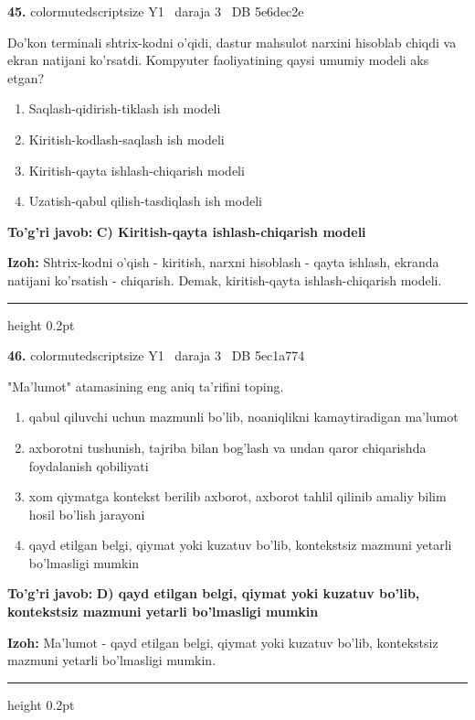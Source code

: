 \documentclass[10pt,a4paper,oneside]{article}
\begin{document}
\noindent\textbf{\color{ink}45.}  {color{muted}scriptsize Y1 \textbullet\ daraja 3 \textbullet\ DB 5e6dec2e}
\par
Do'kon terminali shtrix-kodni o'qidi, dastur mahsulot narxini hisoblab chiqdi va ekran natijani ko'rsatdi. Kompyuter faoliyatining qaysi umumiy modeli aks etgan?
\begin{enumerate}[label=\Alph*),leftmargin=9mm]
\item Saqlash-qidirish-tiklash ish modeli
\item Kiritish-kodlash-saqlash ish modeli
\item Kiritish-qayta ishlash-chiqarish modeli
\item Uzatish-qabul qilish-tasdiqlash ish modeli
\end{enumerate}
\begin{tcolorbox}[enhanced,breakable,colback=teal!4,colframe=teal!50!black,boxrule=0.5pt,arc=1.1mm,left=3mm,right=3mm,top=1.7mm,bottom=1.7mm,before skip=2mm,after skip=2mm]
\textbf{\color{teal}To'g'ri javob:} \textbf{C) Kiritish-qayta ishlash-chiqarish modeli}
\par\smallskip
\textbf{Izoh:} Shtrix-kodni o'qish - kiritish, narxni hisoblash - qayta ishlash, ekranda natijani ko'rsatish - chiqarish. Demak, kiritish-qayta ishlash-chiqarish modeli.
\end{tcolorbox}
\vspace{2mm}\hrule height 0.2pt \vspace{3mm}

\noindent\textbf{\color{ink}46.}  {color{muted}scriptsize Y1 \textbullet\ daraja 3 \textbullet\ DB 5ec1a774}
\par
"Ma'lumot" atamasining eng aniq ta'rifini toping.
\begin{enumerate}[label=\Alph*),leftmargin=9mm]
\item qabul qiluvchi uchun mazmunli bo'lib, noaniqlikni kamaytiradigan ma'lumot
\item axborotni tushunish, tajriba bilan bog'lash va undan qaror chiqarishda foydalanish qobiliyati
\item xom qiymatga kontekst berilib axborot, axborot tahlil qilinib amaliy bilim hosil bo'lish jarayoni
\item qayd etilgan belgi, qiymat yoki kuzatuv bo'lib, kontekstsiz mazmuni yetarli bo'lmasligi mumkin
\end{enumerate}
\begin{tcolorbox}[enhanced,breakable,colback=teal!4,colframe=teal!50!black,boxrule=0.5pt,arc=1.1mm,left=3mm,right=3mm,top=1.7mm,bottom=1.7mm,before skip=2mm,after skip=2mm]
\textbf{\color{teal}To'g'ri javob:} \textbf{D) qayd etilgan belgi, qiymat yoki kuzatuv bo'lib, kontekstsiz mazmuni yetarli bo'lmasligi mumkin}
\par\smallskip
\textbf{Izoh:} Ma'lumot - qayd etilgan belgi, qiymat yoki kuzatuv bo'lib, kontekstsiz mazmuni yetarli bo'lmasligi mumkin.
\end{tcolorbox}
\vspace{2mm}\hrule height 0.2pt \vspace{3mm}
\end{document}
